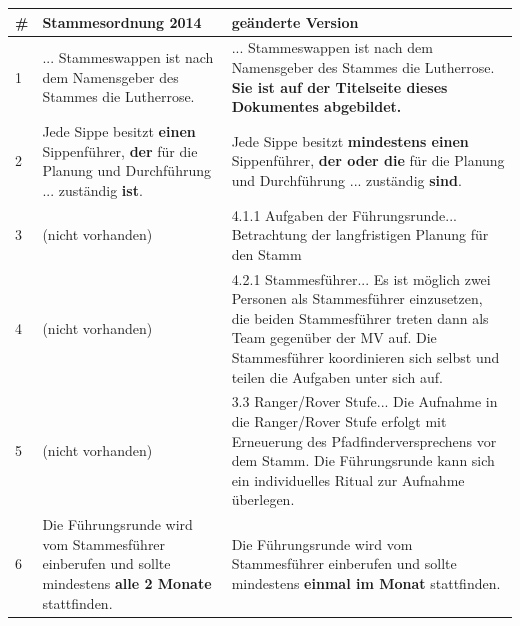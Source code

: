 \documentclass[a4paper]{article}
\begin{document}
\begin{table}[h]
\def\arraystretch{2}
\center
\begin{tabular}{ l|p{}|p{}}
\# & \textbf{Stammesordnung 2014}                                                                         & \textbf{geänderte Version}                                                                                                                                                                                                                 \\ \hline
1  & ... Stammeswappen ist nach dem Namensgeber des Stammes die Lutherrose.                               & ... Stammeswappen ist nach dem Namensgeber des Stammes die Lutherrose. \textbf{Sie ist auf der Titelseite dieses Dokumentes abgebildet.}                                                                                                               \\ \hline
2  & Jede Sippe besitzt \textbf{einen} Sippenführer, \textbf{der} für die Planung und Durchführung ... zuständig \textbf{ist}.       & Jede Sippe besitzt \textbf{mindestens einen} Sippenführer, \textbf{der oder die} für die Planung und Durchführung ... zuständig \textbf{sind}.                                                                                                                        \\ \hline
3  & (nicht vorhanden)                                                                                    & 4.1.1 Aufgaben der Führungsrunde... Betrachtung der langfristigen Planung für den Stamm                                                                                                                                                    \\ \hline
4  & (nicht vorhanden)                                                                                    & 4.2.1 Stammesführer... Es ist möglich zwei Personen als Stammesführer einzusetzen, die beiden Stammesführer treten dann als Team gegenüber der MV auf. Die Stammesführer koordinieren sich selbst und teilen die Aufgaben unter sich auf. \\ \hline
5  & (nicht vorhanden)                                                                                    & 3.3 Ranger/Rover Stufe... Die Aufnahme in die Ranger/Rover Stufe erfolgt mit Erneuerung des Pfadfinderversprechens vor dem Stamm. Die Führungsrunde kann sich ein individuelles Ritual zur Aufnahme überlegen.                                                                                                        \\ \hline
6  & Die Führungsrunde wird vom Stammesführer einberufen und sollte mindestens \textbf{alle 2 Monate} stattfinden. & Die Führungsrunde wird vom Stammesführer einberufen und sollte mindestens \textbf{einmal im Monat} stattfinden.                                                                                                                                    
\end{tabular}
\end{table}
\end{document}
